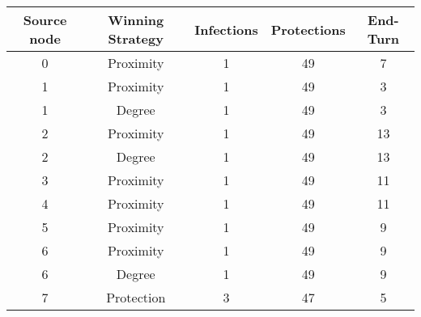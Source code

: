 \documentclass[results.tex]{subfiles}
\begin{document}
    \begin{center}
        \begin{tabular}{| c || c | c | c | c |}
            \hline
            {\bfseries Source node} & {\bfseries Winning Strategy} & {\bfseries Infections} & {\bfseries Protections}
            & {\bfseries End-Turn}
            \\  %
            \hline\hline
            0                       & Proximity                    & 1                      & 49                      & 7                    \\
            \hline
            1                       & Proximity                    & 1                      & 49                      & 3                    \\
            \hline
            1                       & Degree                       & 1                      & 49                      & 3                    \\
            \hline
            2                       & Proximity                    & 1                      & 49                      & 13                   \\
            \hline
            2                       & Degree                       & 1                      & 49                      & 13                   \\
            \hline
            3                       & Proximity                    & 1                      & 49                      & 11                   \\
            \hline
            4                       & Proximity                    & 1                      & 49                      & 11                   \\
            \hline
            5                       & Proximity                    & 1                      & 49                      & 9                    \\
            \hline
            6                       & Proximity                    & 1                      & 49                      & 9                    \\
            \hline
            6                       & Degree                       & 1                      & 49                      & 9                    \\
            \hline
            7                       & Protection                   & 3                      & 47                      & 5                    \\

\end{tabular}
\end{center}
\end{document}
